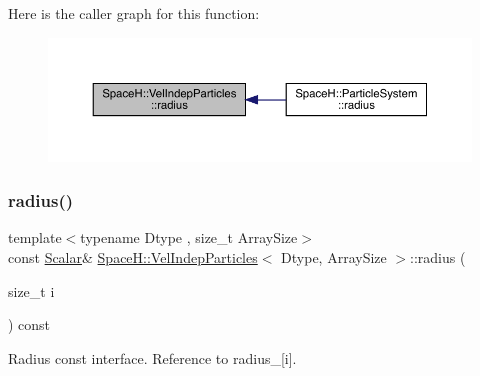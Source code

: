 Here is the caller graph for this function\+:
\nopagebreak
\begin{figure}[H]
\begin{center}
\leavevmode
\includegraphics[width=350pt]{class_space_h_1_1_vel_indep_particles_afa31f804fe6386f0036f59ae25b2175e_icgraph}
\end{center}
\end{figure}
\mbox{\label{class_space_h_1_1_vel_indep_particles_a2abdb6fe4461cf064d8c0e66df1de13d}} 
\subsubsection{\texorpdfstring{radius()}{radius()}\hspace{0.1cm}{\footnotesize\ttfamily [2/2]}}
{\footnotesize\ttfamily template$<$typename Dtype , size\+\_\+t Array\+Size$>$ \\
const \mbox{\hyperlink{class_space_h_1_1_vel_indep_particles_aeb47d8131b30ed790320ff634f0d6af1}{Scalar}}\& \mbox{\hyperlink{class_space_h_1_1_vel_indep_particles}{Space\+H\+::\+Vel\+Indep\+Particles}}$<$ Dtype, Array\+Size $>$\+::radius (\begin{DoxyParamCaption}\item[{size\+\_\+t}]{i }\end{DoxyParamCaption}) const\hspace{0.3cm}{\ttfamily [inline]}}



Radius const interface. Reference to radius\+\_\+\mbox{[}i\mbox{]}. 

\mbox{\label{class_space_h_1_1_vel_indep_particles_a46af27fe0ad3ef6789ead80cbe9cf1e9}} 
